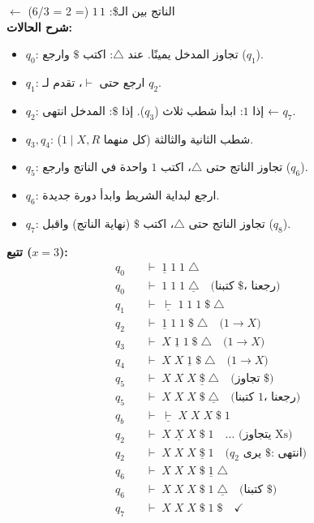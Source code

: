 \documentclass[14pt]{extarticle}
\begin{document}
$\leftarrow$ الناتج بين الـ\$: $1\,1$ (= 2 = 6/3) \checkmark \\

\clearpage
\textbf{شرح الحالات:}
\begin{itemize}
    \item $q_0$: تجاوز المدخل يمينًا. عند $\triangle$: اكتب $\$$ وارجع ($q_1$).
    \item $q_1$: ارجع حتى $\vdash$، تقدم لـ $q_2$.
    \item $q_2$: إذا $1$: ابدأ شطب ثلاث ($q_3$). إذا $\$$: المدخل انتهى ← $q_7$.
    \item $q_3, q_4$: شطب الثانية والثالثة (كل منهما $1 \mid X, R$).
    \item $q_5$: تجاوز الناتج حتى $\triangle$، اكتب $1$ واحدة في الناتج وارجع ($q_6$).
    \item $q_6$: ارجع لبداية الشريط وابدأ دورة جديدة.
    \item $q_7$: تجاوز الناتج حتى $\triangle$، اكتب $\$$ (نهاية الناتج) واقبل ($q_8$).
\end{itemize}

\textbf{تتبع ($x = 3$):}
{ \small
\begin{align*}
q_0 \quad &\vdash \; \underline{1} \; 1 \; 1 \; \triangle \\
q_0 \quad &\vdash \; 1 \; 1 \; 1 \; \underline{\triangle} \quad \text{(كتبنا $\$$، رجعنا)} \\
q_1 \quad &\vdash \; \underline{\vdash} \; 1 \; 1 \; 1 \; \$ \; \triangle \\
q_2 \quad &\vdash \; \underline{1} \; 1 \; 1 \; \$ \; \triangle \quad \text{($1 \to X$)} \\
q_3 \quad &\vdash \; X \; \underline{1} \; 1 \; \$ \; \triangle \quad \text{($1 \to X$)} \\
q_4 \quad &\vdash \; X \; X \; \underline{1} \; \$ \; \triangle \quad \text{($1 \to X$)} \\
q_5 \quad &\vdash \; X \; X \; X \; \underline{\$} \; \triangle \quad \text{(تجاوز $\$$)} \\
q_5 \quad &\vdash \; X \; X \; X \; \$ \; \underline{\triangle} \quad \text{(كتبنا $1$، رجعنا)} \\
q_b \quad &\vdash \; \underline{\vdash} \; X \; X \; X \; \$ \; 1 \\
q_2 \quad &\vdash \; X \; \underline{X} \; X \; \$ \; 1 \quad \text{... (يتجاوز Xs)} \\
q_2 \quad &\vdash \; X \; X \; X \; \underline{\$} \; 1 \quad \text{($q_2$ يرى $\$$: انتهى)} \\
q_6 \quad &\vdash \; X \; X \; X \; \$ \; \underline{1} \; \triangle \\
q_6 \quad &\vdash \; X \; X \; X \; \$ \; 1 \; \underline{\triangle} \quad \text{(كتبنا $\$$)} \\
q_7 \quad &\vdash \; X \; X \; X \; \$ \; 1 \; \$ \quad \checkmark
\end{align*}
}
\end{document}
